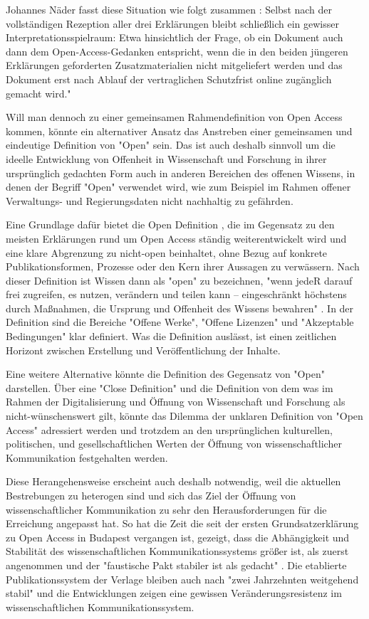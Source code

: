 Johannes Näder fasst diese Situation wie folgt zusammen \cite{naeder_2010_open}:
Selbst nach der vollständigen Rezeption aller drei Erklärungen bleibt schließlich ein gewisser Interpretationsspielraum: Etwa hinsichtlich der Frage, ob ein Dokument auch dann dem Open-Access-Gedanken entspricht, wenn die in den beiden jüngeren Erklärungen geforderten Zusatzmaterialien nicht mitgeliefert werden und das Dokument erst nach Ablauf der vertraglichen Schutzfrist online zugänglich gemacht wird."

Will man dennoch zu einer gemeinsamen Rahmendefinition von Open Access kommen, könnte ein alternativer Ansatz das Anstreben einer gemeinsamen und eindeutige Definition von "Open" sein. Das ist auch deshalb sinnvoll um die ideelle Entwicklung von Offenheit in Wissenschaft und Forschung in ihrer ursprünglich gedachten Form auch in anderen Bereichen des offenen Wissens, in denen der Begriff "Open" verwendet wird, wie zum Beispiel im Rahmen offener Verwaltungs- und Regierungsdaten nicht nachhaltig zu gefährden.

Eine Grundlage dafür bietet die Open Definition \cite{open_definition}, die im Gegensatz zu den meisten Erklärungen rund um Open Access ständig weiterentwickelt wird und eine klare Abgrenzung zu nicht-open beinhaltet, ohne Bezug auf konkrete Publikationsformen, Prozesse oder den Kern ihrer Aussagen zu verwässern. Nach dieser Definition ist Wissen dann als "open" zu bezeichnen, "wenn jedeR darauf frei zugreifen, es nutzen, verändern und teilen kann – eingeschränkt höchstens durch Maßnahmen, die Ursprung und Offenheit des Wissens bewahren" \cite{open_definition}. In der Definition sind die Bereiche "Offene Werke", "Offene Lizenzen" und "Akzeptable Bedingungen" klar definiert. Was die Definition auslässt, ist einen zeitlichen Horizont zwischen Erstellung und Veröffentlichung der Inhalte.

Eine weitere Alternative könnte die Definition des Gegensatz von "Open" darstellen. Über eine "Close Definition" und die Definition von dem was im Rahmen der Digitalisierung und Öffnung von Wissenschaft und Forschung als nicht-wünschenswert gilt, könnte das Dilemma der unklaren Definition von "Open Access" adressiert werden und trotzdem an den ursprünglichen kulturellen, politischen, und gesellschaftlichen Werten der Öffnung von wissenschaftlicher Kommunikation festgehalten werden.

Diese Herangehensweise erscheint auch deshalb notwendig, weil die aktuellen Bestrebungen zu heterogen sind und sich das Ziel der Öffnung von wissenschaftlicher Kommunikation zu sehr den Herausforderungen für die Erreichung angepasst hat. So hat die Zeit die seit der ersten Grundsatzerklärung zu Open Access in Budapest vergangen ist, gezeigt, dass die Abhängigkeit und Stabilität des wissenschaftlichen Kommunikationssystems größer ist, als zuerst angenommen und der "faustische Pakt stabiler ist als gedacht" \cite{hagner_2015_sache_buches}. Die etablierte Publikationssystem der Verlage bleiben auch nach "zwei Jahrzehnten weitgehend stabil" \cite{Hanekop_2014} und die Entwicklungen zeigen eine gewissen Veränderungsresistenz im wissenschaftlichen Kommunikationssystem.


